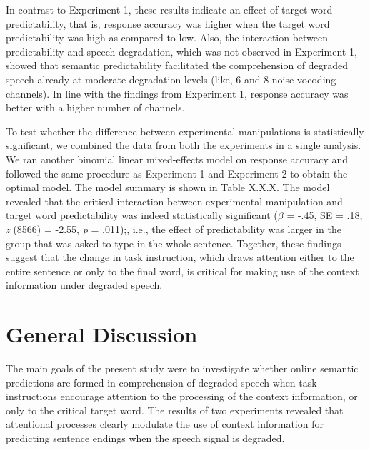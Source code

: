\documentclass[a4paper, nobind]{templates/ociamthesis}
\begin{document}
In contrast to Experiment 1, these results indicate an effect of target word predictability, that is, response accuracy was higher when the target word predictability was high as compared to low.
Also, the interaction between predictability and speech degradation, which was not observed in Experiment 1, showed that semantic predictability facilitated the comprehension of degraded speech already at moderate degradation levels (like, 6 and 8 noise vocoding channels).
In line with the findings from Experiment 1, response accuracy was better with a higher number of channels.

To test whether the difference between experimental manipulations is statistically significant, we combined the data from both the experiments in a single analysis.
We ran another binomial linear mixed-effects model on response accuracy and followed the same procedure as Experiment 1 and Experiment 2 to obtain the optimal model.
The model summary is shown in Table X.X.X.
The model revealed that the critical interaction between experimental manipulation and target word predictability was indeed statistically significant (\(\beta\) = -.45, SE = .18, \emph{z} (8566) = -2.55, \emph{p} = .011);, i.e., the effect of predictability was larger in the group that was asked to type in the whole sentence.
Together, these findings suggest that the change in task instruction, which draws attention either to the entire sentence or only to the final word, is critical for making use of the context information under degraded speech.

\hypertarget{general-discussion}{%
\section{General Discussion}\label{general-discussion}}

The main goals of the present study were to investigate whether online semantic predictions are formed in comprehension of degraded speech when task instructions encourage attention to the processing of the context information, or only to the critical target word.
The results of two experiments revealed that attentional processes clearly modulate the use of context information for predicting sentence endings when the speech signal is degraded.
\end{document}

